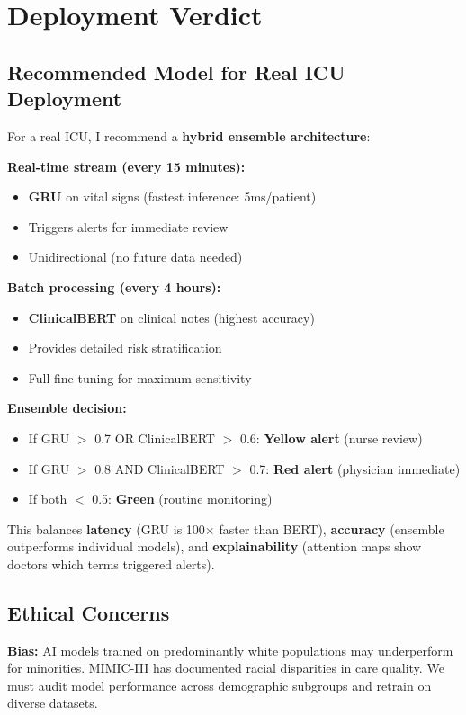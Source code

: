 \documentclass[11pt,a4paper]{article}
\begin{document}
\section{Deployment Verdict}

\subsection{Recommended Model for Real ICU Deployment}

For a real ICU, I recommend a \textbf{hybrid ensemble architecture}:

\textbf{Real-time stream (every 15 minutes):}
\begin{itemize}
\item \textbf{GRU} on vital signs (fastest inference: 5ms/patient)
\item Triggers alerts for immediate review
\item Unidirectional (no future data needed)
\end{itemize}

\textbf{Batch processing (every 4 hours):}
\begin{itemize}
\item \textbf{ClinicalBERT} on clinical notes (highest accuracy)
\item Provides detailed risk stratification
\item Full fine-tuning for maximum sensitivity
\end{itemize}

\textbf{Ensemble decision:}
\begin{itemize}
\item If GRU $>$ 0.7 OR ClinicalBERT $>$ 0.6: \textbf{Yellow alert} (nurse review)
\item If GRU $>$ 0.8 AND ClinicalBERT $>$ 0.7: \textbf{Red alert} (physician immediate)
\item If both $<$ 0.5: \textbf{Green} (routine monitoring)
\end{itemize}

This balances \textbf{latency} (GRU is 100$\times$ faster than BERT), \textbf{accuracy} (ensemble outperforms individual models), and \textbf{explainability} (attention maps show doctors which terms triggered alerts).

\subsection{Ethical Concerns}

\textbf{Bias:} AI models trained on predominantly white populations may underperform for minorities. MIMIC-III has documented racial disparities in care quality. We must audit model performance across demographic subgroups and retrain on diverse datasets.
\end{document}
